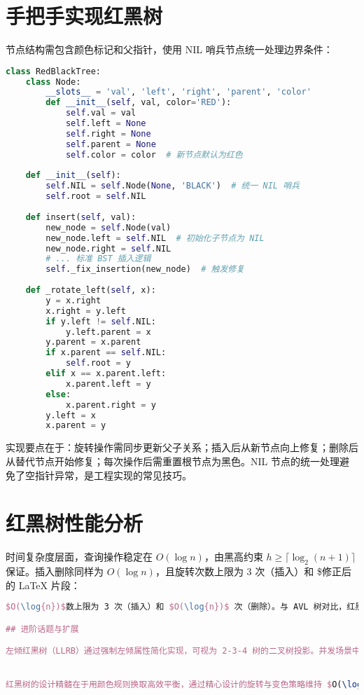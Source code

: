 \chapter{手把手实现红黑树}
节点结构需包含颜色标记和父指针，使用 NIL 哨兵节点统一处理边界条件：\par
\begin{lstlisting}[language=python]
class RedBlackTree:
    class Node:
        __slots__ = 'val', 'left', 'right', 'parent', 'color'
        def __init__(self, val, color='RED'):
            self.val = val
            self.left = None
            self.right = None
            self.parent = None
            self.color = color  # 新节点默认为红色
    
    def __init__(self):
        self.NIL = self.Node(None, 'BLACK')  # 统一 NIL 哨兵
        self.root = self.NIL
    
    def insert(self, val):
        new_node = self.Node(val)
        new_node.left = self.NIL  # 初始化子节点为 NIL
        new_node.right = self.NIL
        # ... 标准 BST 插入逻辑
        self._fix_insertion(new_node)  # 触发修复
        
    def _rotate_left(self, x):
        y = x.right
        x.right = y.left
        if y.left != self.NIL:
            y.left.parent = x
        y.parent = x.parent
        if x.parent == self.NIL:
            self.root = y
        elif x == x.parent.left:
            x.parent.left = y
        else:
            x.parent.right = y
        y.left = x
        x.parent = y
\end{lstlisting}
实现要点在于：旋转操作需同步更新父子关系；插入后从新节点向上修复；删除后从替代节点开始修复；每次操作后需重置根节点为黑色。NIL 节点的统一处理避免了空指针异常，是工程实现的常见技巧。\par
\chapter{红黑树性能分析}
时间复杂度层面，查询操作稳定在 $O(\log{n})$，由黑高约束 $h \geq\lceil\log_2(n+1)\rceil$ 保证。插入删除同样为 $O(\log{n})$，且旋转次数上限为 3 次（插入）和 \${}修正后的 LaTeX 片段：\par
\begin{lstlisting}[language=latex]
$O(\log{n})$数上限为 3 次（插入）和 $O(\log{n})$ 次（删除）。与 AVL 树对比，红黑树在插入删除时旋转更少，但查询稍慢（树高更高）。空间复杂度为$ 次（删除）。与 AVL 树对比，红黑树在插入删除时旋转更少，但查询稍慢（树高更高）。空间复杂度为 $O(n)$，每个节点需额外存储颜色和父指针。  

## 进阶话题与扩展  

左倾红黑树（LLRB）通过强制左倾属性简化实现，可视为 2-3-4 树的二叉树投影。并发场景中，读多写少时可使用读写锁优化。调试时需递归验证五大性质，特别要检查所有路径黑高是否一致。常见陷阱包括：未正确处理 NIL 节点颜色（必须为黑）、旋转后忘记更新父指针、删除后未重置根节点颜色。可视化工具如 Graphviz 能生成树结构图辅助验证。  


红黑树的设计精髓在于用颜色规则换取高效平衡，通过精心设计的旋转与变色策略维持 $O(\log{n})$ 的操作复杂度。它特别适合高频写入的关联容器场景，如数据库索引和内存缓存。学习红黑树不仅能掌握经典数据结构，更能深入理解复杂系统设计中的权衡艺术（Trade-off）—— 在理论完美性与工程实用性之间寻找最佳平衡点。
\end{lstlisting}
